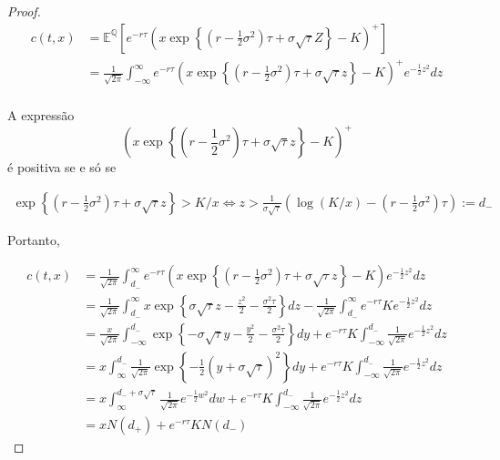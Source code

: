 \documentclass{article}
\begin{document}
\begin{proof}
\begin{align*}
    c(t,x)&=\mathbb{E^Q} \left[ e^{-r \tau} \left( x\exp \left\{ \left(r-\frac{1}{2}\sigma^2\right)\tau+\sigma\sqrt{\tau} Z \right\} -K\right)^+  \right]\\
          &=\frac{1}{\sqrt{2\pi}}\int_{-\infty}^\infty e^{-r \tau} \left( x\exp \left\{ \left(r-\frac{1}{2}\sigma^2\right)\tau+\sigma\sqrt{\tau} z \right\} -K\right)^+ e^{-\frac{1}{2}z^2}dz\\
\end{align*}

A expressão 
$$\left( x\exp \left\{ \left(r-\frac{1}{2}\sigma^2\right)\tau+\sigma\sqrt{\tau} z \right\} -K\right)^+ $$
é positiva se e só se 

\begin{align*}
    \exp \left\{ \left(r-\frac{1}{2}\sigma^2\right)\tau+\sigma\sqrt{\tau} z \right\} >K/x \Leftrightarrow z> \frac{1}{\sigma \sqrt{\tau}} \left( \log(K/x)- \left(r-\frac{1}{2}\sigma^2 \right)\tau \right) :=d_-
\end{align*}


Portanto, 

\begin{align*}
    c(t,x) &= \frac{1}{\sqrt{2\pi}}\int_{d_-}^\infty e^{-r \tau}\left( x\exp \left\{ \left(r-\frac{1}{2}\sigma^2\right)\tau+\sigma\sqrt{\tau} z \right\} -K\right) e^{-\frac{1}{2}z^2} dz\\           
           &=\frac{1}{\sqrt{2\pi}}\int_{d_-}^\infty x\exp \left\{ \sigma \sqrt{\tau}z-\frac{z^2}{2} -\frac{\sigma^2 \tau}{2} \right\} dz - \frac{1}{\sqrt{2\pi}} \int_{d_-}^\infty e^{-r\tau}Ke^{-\frac{1}{2}z^2}dz\\
           &=\frac{x}{\sqrt{2\pi}}\int_{-\infty}^{d_-} \exp \left\{ -\sigma \sqrt{\tau} y- \frac{y^2}{2} -\frac{\sigma^2\tau}{2}  \right\}dy +e^{-r\tau} K \int_{-\infty }^{d_-} \frac{1}{\sqrt{2\pi}}e^{-\frac{1}{2}z^2}dz\\
           &=x\int_{\infty}^{d_-}\frac{1}{\sqrt{2\pi}}\exp\left\{ -\frac{1}{2} \left ( y+\sigma\sqrt{\tau} \right)^2 \right\}dy + e^{-r\tau} K \int_{-\infty }^{d_-} \frac{1}{\sqrt{2\pi}}e^{-\frac{1}{2}z^2}dz\\
           &=x\int_{\infty}^{d_-+\sigma \sqrt{\tau}}\frac{1}{\sqrt{2\pi}}e^{-\frac{1}{2}w^2}dw + e^{-r\tau} K \int_{-\infty }^{d_-} \frac{1}{\sqrt{2\pi}}e^{-\frac{1}{2}z^2}dz\\
           &=xN(d_+)+e^{-r \tau}KN(d_-)            
\end{align*}
\end{proof}
\end{document}
